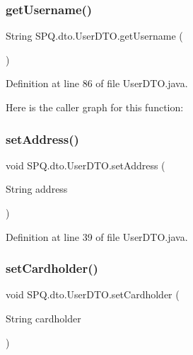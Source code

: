 \subsubsection{\texorpdfstring{get\+Username()}{getUsername()}}
{\footnotesize\ttfamily String S\+P\+Q.\+dto.\+User\+D\+T\+O.\+get\+Username (\begin{DoxyParamCaption}{ }\end{DoxyParamCaption})}



Definition at line 86 of file User\+D\+T\+O.\+java.

Here is the caller graph for this function\+:
\mbox{\label{class_s_p_q_1_1dto_1_1_user_d_t_o_a9ea48b87767eb765aac4f10d0cb9d53a}} 
\subsubsection{\texorpdfstring{set\+Address()}{setAddress()}}
{\footnotesize\ttfamily void S\+P\+Q.\+dto.\+User\+D\+T\+O.\+set\+Address (\begin{DoxyParamCaption}\item[{String}]{address }\end{DoxyParamCaption})}



Definition at line 39 of file User\+D\+T\+O.\+java.

\mbox{\label{class_s_p_q_1_1dto_1_1_user_d_t_o_a3627efce4d0873f1e706e8ad65a28506}} 
\subsubsection{\texorpdfstring{set\+Cardholder()}{setCardholder()}}
{\footnotesize\ttfamily void S\+P\+Q.\+dto.\+User\+D\+T\+O.\+set\+Cardholder (\begin{DoxyParamCaption}\item[{String}]{cardholder }\end{DoxyParamCaption})}



